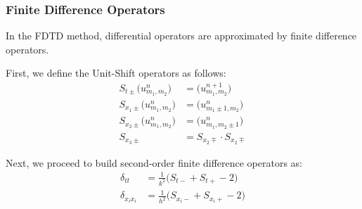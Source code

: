 \documentclass{beamer}
\begin{document}
\begin{frame}
\frametitle{Finite Difference Operators}

In the FDTD method, differential operators are approximated by finite difference operators. 

First, we define the Unit-Shift operators as follows:
\begin{align}
S_{t\pm}\big( u^n_{m_1,m_2}\big) &= \big( u^{n+1}_{m_1,m_2}\big)\\
S_{x_1 \pm}\big( u^{n}_{m_1,m_2}\big) &= \big( u^{n}_{m_1 \pm 1,m_2}\big)\\
S_{x_2 \pm}\big( u^{n}_{m_1,m_2}\big) &= \big( u^{n}_{m_1,m_2 \pm 1}\big)\\
S_{x_3 \pm} &= S_{x_2 \mp} \cdot S_{x_2 \mp}
\end{align}

Next, we proceed to build second-order finite difference operators as:
\begin{align}
\delta_{tt} &= \frac{1}{k^2} \big( S_{t-} + S_{t+} -2 \big)\\
\delta_{x_i x_i} &= \frac{1}{h^2} \big( S_{x_i -} + S_{x_i +} -2 \big)\\
\end{align}
\end{frame}
\end{document}
